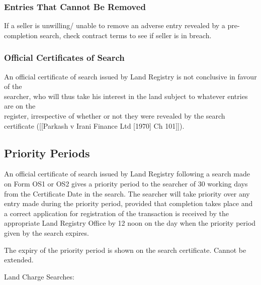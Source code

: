 \documentclass[
]{article}
\begin{document}
\hypertarget{entries-that-cannot-be-removed}{%
\subsubsection{Entries That Cannot Be
Removed}\label{entries-that-cannot-be-removed}}

If a seller is unwilling/ unable to remove an adverse entry revealed by
a pre-completion search, check contract terms to see if seller is in
breach.

\hypertarget{official-certificates-of-search}{%
\subsubsection{Official Certificates of
Search}\label{official-certificates-of-search}}

An official certificate of search issued by Land Registry is not
conclusive in favour of the\\
searcher, who will thus take his interest in the land subject to
whatever entries are on the\\
register, irrespective of whether or not they were revealed by the
search certificate ({[}{[}Parkash v Irani Finance Ltd {[}1970{]} Ch
101{]}{]}).

\hypertarget{priority-periods}{%
\subsection{Priority Periods}\label{priority-periods}}

An official certificate of search issued by Land Registry following a
search made on Form OS1 or OS2 gives a priority period to the searcher
of 30 working days from the Certificate Date in the search. The searcher
will take priority over any entry made during the priority period,
provided that completion takes place and a correct application for
registration of the transaction is received by the appropriate Land
Registry Office by 12 noon on the day when the priority period given by
the search expires.

The expiry of the priority period is shown on the search certificate.
Cannot be extended.

Land Charge Searches:
\end{document}
